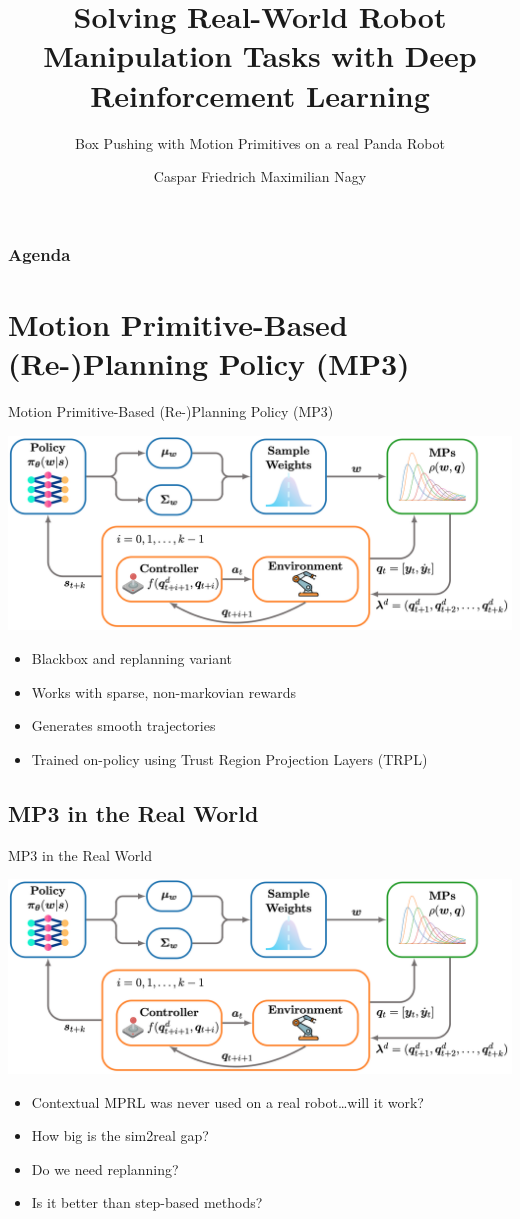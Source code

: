 \documentclass[16:9,en,navbarinfooter]{sdqbeamer}
\author{Caspar Friedrich Maximilian Nagy}
\title{Solving Real-World Robot Manipulation Tasks with Deep Reinforcement Learning}
\subtitle{Box Pushing with Motion Primitives on a real Panda Robot}
\begin{document}
\KITtitleframe{}



\begin{frame}
\frametitle{Agenda}
    \vspace{1cm}
\tableofcontents
\end{frame}

\section{Motion Primitive-Based (Re-)Planning Policy (MP3)}
\begin{frame}{Motion Primitive-Based (Re-)Planning Policy (MP3)}

\center 
    \vspace{1cm}
\includegraphics[width=.7\linewidth]{media/mp3.png}
\begin{itemize}
\item Blackbox and replanning variant
\item Works with sparse, non-markovian rewards
\item Generates smooth trajectories
\item Trained on-policy using Trust Region Projection Layers (TRPL)
\end{itemize}
\end{frame}

\subsection{MP3 in the Real World}
\begin{frame}{MP3 in the Real World}

\center 
    \vspace{1cm}
\includegraphics[width=.7\linewidth]{media/mp3.png}
   \begin{itemize}
           \item Contextual MPRL was never used on a real robot\dots will it work?
           \item How big is the sim2real gap?
           \item Do we need replanning?
           \item Is it better than step-based methods?
\end{itemize}
\end{frame}
\end{document}
